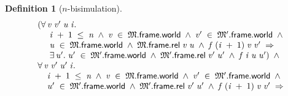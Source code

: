 \documentclass[letterpaper]{article}
\newtheorem{defn}{Definition}
\newenvironment{holmath}{\begin{displaymath}\begin{array}{l}}{\end{array}\end{displaymath}\ignorespacesafterend}
\begin{document}
\begin{defn}[$n$-bisimulation]
\begin{holmath}
\;\;(\HOLSymConst{\HOLTokenForall{}}\HOLBoundVar{v}\;\HOLBoundVar{v\sp{\prime}}\;\HOLBoundVar{u}\;\HOLBoundVar{i}.\\
\;\;\;\;\;\;\;\HOLBoundVar{i}\;\HOLSymConst{\ensuremath{+}}\;\HOLNumLit{1}\;\HOLSymConst{\HOLTokenLeq{}}\;\HOLFreeVar{n}\;\HOLSymConst{\HOLTokenConj{}}\;\HOLBoundVar{v}\;\HOLSymConst{\HOLTokenIn{}}\;\HOLFreeVar{\ensuremath{\mathfrak{M}}}.\HOLFieldName{frame}.\HOLFieldName{world}\;\HOLSymConst{\HOLTokenConj{}}\;\HOLBoundVar{v\sp{\prime}}\;\HOLSymConst{\HOLTokenIn{}}\;\HOLFreeVar{\ensuremath{\mathfrak{M}'}}.\HOLFieldName{frame}.\HOLFieldName{world}\;\HOLSymConst{\HOLTokenConj{}}\\
\;\;\;\;\;\;\;\HOLBoundVar{u}\;\HOLSymConst{\HOLTokenIn{}}\;\HOLFreeVar{\ensuremath{\mathfrak{M}}}.\HOLFieldName{frame}.\HOLFieldName{world}\;\HOLSymConst{\HOLTokenConj{}}\;\HOLFreeVar{\ensuremath{\mathfrak{M}}}.\HOLFieldName{frame}.\HOLFieldName{rel}\;\HOLBoundVar{v}\;\HOLBoundVar{u}\;\HOLSymConst{\HOLTokenConj{}}\;\HOLFreeVar{f}\;(\HOLBoundVar{i}\;\HOLSymConst{\ensuremath{+}}\;\HOLNumLit{1})\;\HOLBoundVar{v}\;\HOLBoundVar{v\sp{\prime}}\;\HOLSymConst{\HOLTokenImp{}}\\
\;\;\;\;\;\;\;\HOLSymConst{\HOLTokenExists{}}\HOLBoundVar{u\sp{\prime}}.\;\HOLBoundVar{u\sp{\prime}}\;\HOLSymConst{\HOLTokenIn{}}\;\HOLFreeVar{\ensuremath{\mathfrak{M}'}}.\HOLFieldName{frame}.\HOLFieldName{world}\;\HOLSymConst{\HOLTokenConj{}}\;\HOLFreeVar{\ensuremath{\mathfrak{M}'}}.\HOLFieldName{frame}.\HOLFieldName{rel}\;\HOLBoundVar{v\sp{\prime}}\;\HOLBoundVar{u\sp{\prime}}\;\HOLSymConst{\HOLTokenConj{}}\;\HOLFreeVar{f}\;\HOLBoundVar{i}\;\HOLBoundVar{u}\;\HOLBoundVar{u\sp{\prime}})\;\HOLSymConst{\HOLTokenConj{}}\\
\;\;\HOLSymConst{\HOLTokenForall{}}\HOLBoundVar{v}\;\HOLBoundVar{v\sp{\prime}}\;\HOLBoundVar{u\sp{\prime}}\;\HOLBoundVar{i}.\\
\;\;\;\;\;\;\HOLBoundVar{i}\;\HOLSymConst{\ensuremath{+}}\;\HOLNumLit{1}\;\HOLSymConst{\HOLTokenLeq{}}\;\HOLFreeVar{n}\;\HOLSymConst{\HOLTokenConj{}}\;\HOLBoundVar{v}\;\HOLSymConst{\HOLTokenIn{}}\;\HOLFreeVar{\ensuremath{\mathfrak{M}}}.\HOLFieldName{frame}.\HOLFieldName{world}\;\HOLSymConst{\HOLTokenConj{}}\;\HOLBoundVar{v\sp{\prime}}\;\HOLSymConst{\HOLTokenIn{}}\;\HOLFreeVar{\ensuremath{\mathfrak{M}'}}.\HOLFieldName{frame}.\HOLFieldName{world}\;\HOLSymConst{\HOLTokenConj{}}\\
\;\;\;\;\;\;\HOLBoundVar{u\sp{\prime}}\;\HOLSymConst{\HOLTokenIn{}}\;\HOLFreeVar{\ensuremath{\mathfrak{M}'}}.\HOLFieldName{frame}.\HOLFieldName{world}\;\HOLSymConst{\HOLTokenConj{}}\;\HOLFreeVar{\ensuremath{\mathfrak{M}'}}.\HOLFieldName{frame}.\HOLFieldName{rel}\;\HOLBoundVar{v\sp{\prime}}\;\HOLBoundVar{u\sp{\prime}}\;\HOLSymConst{\HOLTokenConj{}}\;\HOLFreeVar{f}\;(\HOLBoundVar{i}\;\HOLSymConst{\ensuremath{+}}\;\HOLNumLit{1})\;\HOLBoundVar{v}\;\HOLBoundVar{v\sp{\prime}}\;\HOLSymConst{\HOLTokenImp{}}\\

\end{holmath}
\end{defn}
\end{document}
